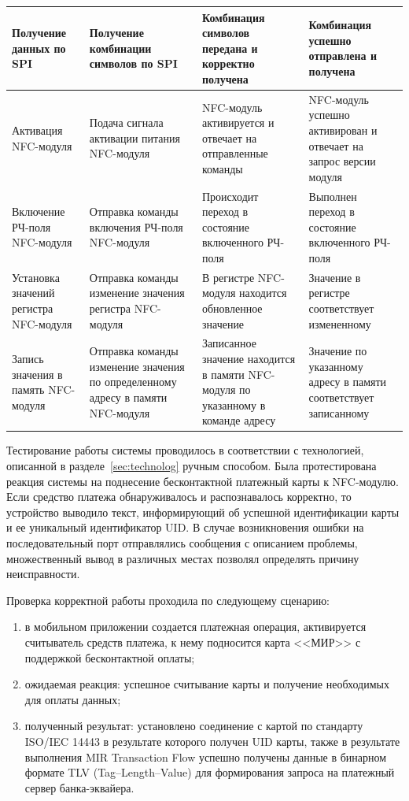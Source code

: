 \begin{longtable}[l]{| P{0.18\textwidth} | P{0.2\textwidth} | P{0.26\textwidth} | P{0.26\textwidth}|}
    Получение данных по SPI &
    Получение комбинации символов по SPI &
    Комбинация символов передана и корректно получена &
    Комбинация успешно отправлена и получена \\
    \hline

    Активация NFC-модуля &
    Подача сигнала активации питания NFC-модуля &
    NFC-модуль активируется и отвечает на отправленные команды &
    NFC-модуль успешно активирован и отвечает на запрос версии модуля \\
    \hline

    Включение РЧ-поля NFC-модуля &
    Отправка команды включения РЧ-поля NFC-модуля &
    Происходит переход в состояние включенного РЧ-поля &
    Выполнен переход в состояние включенного РЧ-поля \\
    \hline

    Установка значений регистра NFC-модуля &
    Отправка команды изменение значения регистра NFC-модуля &
    В регистре NFC-модуля находится обновленное значение &
    Значение в регистре соответствует измененному \\
    \hline

    Запись значения в память NFC-модуля &
    Отправка команды изменение значения по определенному адресу в памяти NFC-модуля &
    Записанное значение находится в памяти NFC-модуля по указанному в команде адресу &
    Значение по указанному адресу в памяти соответствует записанному \\
    \hline

\end{longtable}

Тестирование работы системы проводилось в соответствии с технологией, описанной в разделе~\ref{sec:technolog} ручным способом.
Была протестирована реакция системы на поднесение бесконтактной платежный карты к NFC-модулю.
Если средство платежа обнаруживалось и распознавалось корректно, то устройство выводило текст, информирующий об успешной идентификации карты и ее уникальный идентификатор UID.
В случае возникновения ошибки на последовательный порт отправлялись сообщения с описанием проблемы, множественный вывод в различных местах позволял определять причину неисправности.

Проверка корректной работы проходила по следующему сценарию:
\begin{enumerate}
    \item в мобильном приложении создается платежная операция, активируется считыватель средств платежа, к нему подносится карта <<МИР>> с поддержкой бесконтактной оплаты;
    \item ожидаемая реакция: успешное считывание карты и получение необходимых для оплаты данных;
    \item полученный результат: установлено соединение с картой по стандарту ISO/IEC 14443 в результате которого получен UID карты, также в результате выполнения MIR Transaction Flow успешно получены данные в бинарном формате TLV (Tag--Length--Value) для формирования запроса на платежный сервер банка-эквайера.
\end{enumerate}


